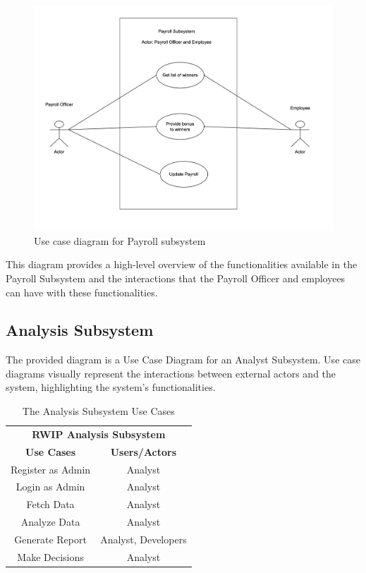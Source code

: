 \begin{figure}[h!t]
    \centering
    \includegraphics[width=\textwidth]{images/ucPayroll.png}
    \caption{Use case diagram for Payroll subsystem}
    \label{fig:ucPayroll}
\end{figure}

\FloatBarrier

This diagram provides a high-level overview of the functionalities available in the Payroll Subsystem and the interactions that the Payroll Officer and employees can have with these functionalities.

\subsection{Analysis Subsystem}
The provided diagram is a Use Case Diagram for an Analyst Subsystem. Use case diagrams visually represent the interactions between external actors and the system, highlighting the system's functionalities. 

\begin{table}[h!t]
\caption{The Analysis Subsystem Use Cases}
{%
\newcommand{\mc}[2]{\multicolumn{#1}{#2}}
\begin{center}
\begin{tabular}{|c|c|}
\hline
\multicolumn{2}{|c|}{\textbf{RWIP Analysis Subsystem}} \\ \cline{1-2}
\textbf{Use Cases} & \textbf{Users/Actors} \\
\hline
\rule{0pt}{24pt}  Register as Admin & Analyst \\
\hline
\rule{0pt}{24pt}  Login as Admin & Analyst \\
\hline
\rule{0pt}{24pt}  Fetch Data & Analyst \\
\hline
\rule{0pt}{24pt}  Analyze Data & Analyst \\
\hline
\rule{0pt}{24pt}  Generate Report & Analyst, Developers \\
\hline
\rule{0pt}{24pt}  Make Decisions & Analyst \\
\hline
\end{tabular}
\end{center}
}%
\label{tab:analysis}
\end{table}

